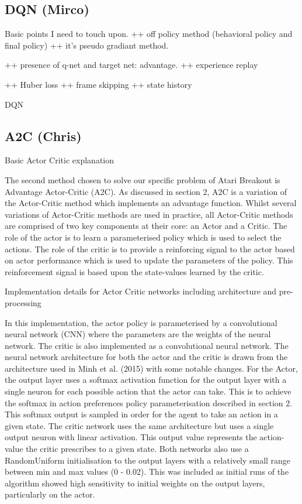 \documentclass{article}
\begin{document}
\subsection{DQN (Mirco)}
Basic points I need to touch upon.
++ off policy method (behavioral policy and final policy)
++ it's pseudo gradiant method.

++ presence of q-net and target net: advantage.
++ experience replay

++ Huber loss
++ frame skipping
++ state history

DQN 

\subsection{A2C (Chris)}


Basic Actor Critic explanation

The second method chosen to solve our specific problem of Atari Breakout is Advantage Actor-Critic (A2C). As discussed in section 2, A2C is a variation of the Actor-Critic method which implements an advantage function. Whilst several variations of Actor-Critic methods are used in practice, all Actor-Critic methods are comprised of two key components at their core: an Actor and a Critic. The role of the actor is to learn a parameterised policy which is used to select the actions. The role of the critic is to provide a reinforcing signal to the actor based on actor performance which is used to update the parameters of the policy. This reinforcement signal is based upon the state-values learned by the critic.

Implementation details for Actor Critic networks including architecture and pre-processing

In this implementation, the actor policy is parameterised by a convolutional neural network (CNN) where the parameters are the weights of the neural network. The critic is also implemented as a convolutional neural network. The neural network architecture for both the actor and the critic is drawn from the architecture used in Minh et al. (2015) with some notable changes. For the Actor, the output layer uses a softmax activation function for the output layer with a single neuron for each possible action that the actor can take. This is to achieve the softmax in action preferences policy parameterisation described in section 2. This softmax output is sampled in order for the agent to take an action in a given state. The critic network uses the same architecture but uses a single output neuron with linear activation. This output value represents the action-value the critic prescribes to a given state. Both networks also use a RandomUniform initialisation to the output layers with a relatively small range between min and max values (0 - 0.02). This was included as initial runs of the algorithm showed high sensitivity to initial weights on the output layers, particularly on the actor.
\end{document}
